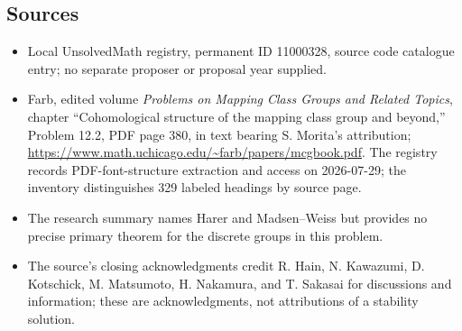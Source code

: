 \documentclass[11pt]{article}
\begin{document}
\subsection{Sources}
\begin{itemize}
\item Local UnsolvedMath registry, permanent ID 11000328, source code catalogue entry; no separate proposer or proposal year supplied.
\item Farb, edited volume \emph{Problems on Mapping Class Groups and Related Topics}, chapter ``Cohomological structure of the mapping class group and beyond,'' Problem 12.2, PDF page 380, in text bearing S. Morita's attribution; \url{https://www.math.uchicago.edu/~farb/papers/mcgbook.pdf}. The registry records PDF-font-structure extraction and access on 2026-07-29; the inventory distinguishes 329 labeled headings by source page.
\item The research summary names Harer and Madsen--Weiss but provides no precise primary theorem for the discrete groups in this problem.
\item The source's closing acknowledgments credit R. Hain, N. Kawazumi, D. Kotschick, M. Matsumoto, H. Nakamura, and T. Sakasai for discussions and information; these are acknowledgments, not attributions of a stability solution.
\end{itemize}
\end{document}
